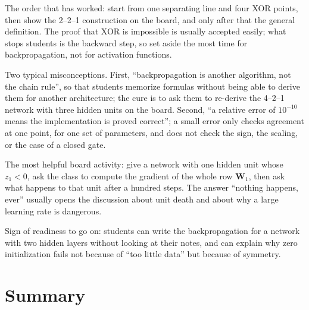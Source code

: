 \begin{untukdosen}
The order that has worked: start from one separating line and four XOR points, then show the
2--2--1 construction on the board, and only after that the general definition. The proof that XOR
is impossible is usually accepted easily; what stops students is the backward step, so set aside
the most time for backpropagation, not for activation functions.

Two typical misconceptions. First, ``backpropagation is another algorithm, not the chain rule'',
so that students memorize formulas without being able to derive them for another architecture;
the cure is to ask them to re-derive the 4--2--1 network with three hidden units on the board.
Second, ``a relative error of $10^{-10}$ means the implementation is proved correct''; a small
error only checks agreement at one point, for one set of parameters, and does not check the sign,
the scaling, or the case of a closed gate.

The most helpful board activity: give a network with one hidden unit whose $z_{1}<0$, ask the
class to compute the gradient of the whole row $\mathbf{W}_{1}$, then ask what happens to that
unit after a hundred steps. The answer ``nothing happens, ever'' usually opens the discussion
about unit death and about why a large learning rate is dangerous.

Sign of readiness to go on: students can write the backpropagation for a network with two hidden
layers without looking at their notes, and can explain why zero initialization fails not because
of ``too little data'' but because of symmetry.
\end{untukdosen}

\section{Summary}


